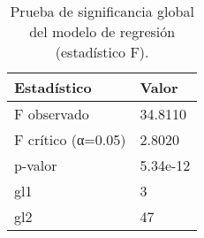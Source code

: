 \begin{table}
\caption{Prueba de significancia global del modelo de regresión (estadístico F).}
\label{tab:prueba_f}
\begin{tabular}{ll}
\toprule
Estadístico & Valor \\
\midrule
F observado & 34.8110 \\
F crítico (α=0.05) & 2.8020 \\
p-valor & 5.34e-12 \\
gl1 & 3 \\
gl2 & 47 \\
\bottomrule
\end{tabular}
\end{table}

